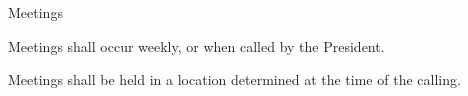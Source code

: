 {
	\begin{article}{Meetings}
		\item Meetings shall occur weekly, or when called by the President.
		\item Meetings shall be held in a location determined at the time of the calling.
	\end{article}
}